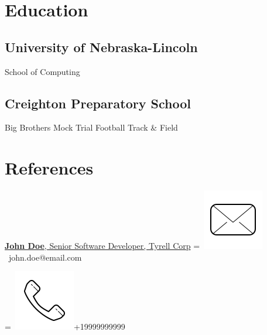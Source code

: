 \documentclass[]{latex/resume}
\begin{document}
\begin{minipage}[t]{0.25\textwidth}
\section{Education} 
    \subsection{University of Nebraska-Lincoln}
    School of Computing \\

    \sectionsep

    \subsection{Creighton Preparatory School} 
    Big Brothers \textbullet{} Mock Trial \textbullet{} Football \textbullet{} Track & Field 
    \\   

    \sectionsep


\section{References}

    \href{https://www.linkedin.com/company/john-doe/}{\textbf{John Doe}, Senior Software Developer, Tyrell Corp}
    \begingroup
        =\hbox{
            \includegraphics[scale=0.1,trim={0 1cm 0cm 0cm}]{latex/icons/mail.png}\hspace{0.3cm} john.doe@email.com
        }
        \parbox{\wd0}{}
    \endgroup
    
    \begingroup
        =\hbox{
        \includegraphics[scale=0.1,trim={0 1.25cm -0.4cm 0cm}]{latex/icons/phone.png}\hspace{0.3cm}+19999999999
        }
        \parbox{\wd0}{}
    \endgroup \\ 


\end{minipage}
\end{document}
